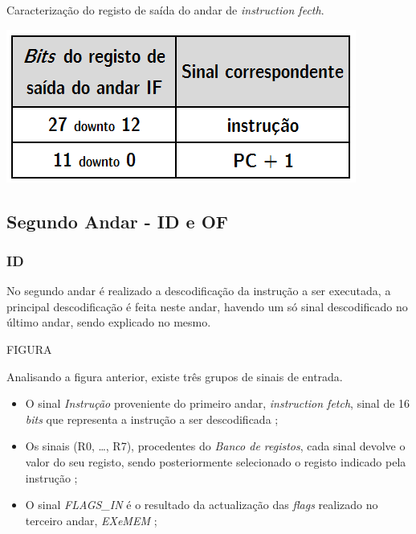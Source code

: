 \documentclass[11pt]{article}
\numberwithin{equation}{section}
\begin{document}

\begin{table}[h]
	\centering
	\caption{Caracterização do registo de saída do andar de \textit{instruction fecth}.}
	\vspace{-2mm}
 	\includegraphics[keepaspectratio=true, scale=0.35]{tabelas/regIF}
\end{table}

\subsection{Segundo Andar - ID e OF}

\subsubsection{ID}

No segundo andar é realizado a descodificação da instrução a ser executada, a principal descodificação é feita neste andar, havendo um só sinal descodificado no último andar, sendo explicado no mesmo.

FIGURA

Analisando a figura anterior, existe três grupos de sinais de entrada.

\vspace{-2mm}

\begin{itemize}
	\item  O sinal \textit{Instrução} proveniente do primeiro andar, \textit{instruction fetch}, sinal de 16 \textit{bits} que representa a instrução a ser descodificada   ;
	\vspace{-2.5mm}
	\item Os sinais (R0, \ldots, R7), procedentes do \textit{Banco de registos}, cada sinal devolve o valor do seu registo, sendo posteriormente selecionado o registo indicado pela instrução ;
	\vspace{-2.5mm}
	\item  O sinal \textit{FLAGS\_IN} é o resultado da actualização das \textit{flags} realizado no terceiro andar, \textit{EXeMEM} ;
\end{itemize}
\end{document}
